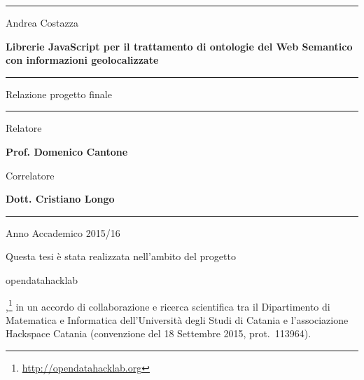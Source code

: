 \documentclass[a4paper,11pt]{article}
\begin{document}
\begin{center}
	\hrule
\end{center}

\vspace*{50pt}

\begin{center}
	\LARGE Andrea Costazza
\end{center}

\vspace*{30pt}

\begin{center}
	\LARGE \textbf{Librerie JavaScript per il trattamento di ontologie del Web Semantico con informazioni geolocalizzate}

\end{center}


\vspace*{80pt}

\noindent\hfil\rule{0.2\textwidth}{.4pt}\hfil

\begin{center}
	\Large Relazione progetto finale
\end{center}

\noindent\hfil\rule{0.2\textwidth}{.4pt}\hfil

\vspace*{180pt}

\begin{flushright}
	\Large Relatore

	\Large \textbf {Prof. Domenico Cantone}
\end{flushright}
\begin{flushright}
	\Large Correlatore

	\Large \textbf {Dott. Cristiano Longo}
\end{flushright}

\bigskip
\bigskip

\hrule

\begin{center}
	\Large Anno Accademico 2015/16
\end{center}
\thispagestyle{empty}
\newpage
\null
\thispagestyle{empty}

\newpage

\vspace*{80pt}
Questa tesi \`e stata realizzata nell'ambito del progetto \begin{tt}opendatahacklab\end{tt},\footnote{\url{http://opendatahacklab.org}} in un accordo di collaborazione e ricerca scientifica tra il Dipartimento di Matematica e Informatica dell'Universit\`a degli Studi di Catania e l'associazione Hackspace Catania (convenzione del 18 Settembre 2015, prot.\ 113964). 
\newpage
\end{document}

